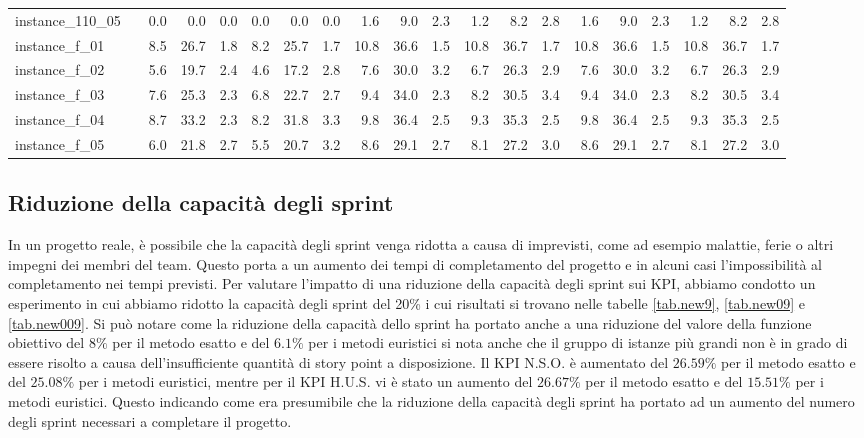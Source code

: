 \documentclass[12pt,a4paper,openright,twoside]{book}
\begin{document}
\begin{table}[H]
{\begin{tabular}{|ll|rrrrrr|rrrrrr|rrrrrr|}
 instance\_110\_05            &     &    0.0  &   0.0  &  0.0  &   0.0  &   0.0  &  0.0    &    1.6  &   9.0  &  2.3  &   1.2  &   8.2  &  2.8  &     1.6  &   9.0  &  2.3  &   1.2  &   8.2  &  2.8    \\   
 instance\_f\_01              &     &    8.5  &   26.7  &  1.8  &   8.2  &   25.7  &  1.7  &   10.8  &   36.6  &  1.5  &   10.8  &   36.7  &  1.7  &    10.8  &   36.6  &  1.5  &   10.8  &   36.7  &  1.7   \\ 
 instance\_f\_02              &     &    5.6  &   19.7  &  2.4  &   4.6  &   17.2  &  2.8  &    7.6  &   30.0  &  3.2  &   6.7  &   26.3  &  2.9  &     7.6  &   30.0  &  3.2  &   6.7  &   26.3  &  2.9   \\ 
 instance\_f\_03              &     &    7.6  &   25.3  &  2.3  &   6.8  &   22.7  &  2.7  &   9.4  &   34.0  &  2.3  &   8.2  &   30.5  &  3.4  &    9.4  &   34.0  &  2.3  &   8.2  &   30.5  &  3.4   \\ 
 instance\_f\_04              &     &    8.7  &   33.2  &  2.3  &   8.2  &   31.8  &  3.3  &    9.8  &   36.4  &  2.5  &   9.3  &   35.3  &  2.5  &     9.8  &   36.4  &  2.5  &   9.3  &   35.3  &  2.5   \\ 
 instance\_f\_05              &     &    6.0  &   21.8  &  2.7  &   5.5  &   20.7  &  3.2  &   8.6  &   29.1  &  2.7  &   8.1  &   27.2  &  3.0  &    8.6  &   29.1  &  2.7  &   8.1  &   27.2  &  3.0   \\ 
  \hline
\end{tabular}
}
\end{table}

\subsection{Riduzione della capacità degli sprint}



In un progetto reale, \`e possibile che la capacità degli sprint venga ridotta a causa di imprevisti, come ad esempio malattie, ferie o altri impegni dei membri del team. Questo porta a un aumento dei tempi di completamento del progetto e in alcuni casi l'impossibilità al completamento nei tempi previsti.
Per valutare l'impatto di una riduzione della capacità degli sprint sui KPI, abbiamo condotto un esperimento in cui abbiamo ridotto la capacità degli sprint del 20\% i cui risultati si trovano nelle tabelle \ref{tab.new9}, \ref{tab.new09} e \ref{tab.new009}.
Si può  notare come la riduzione della capacità dello sprint ha portato anche a una riduzione del valore della funzione obiettivo del $8\%$ per il metodo esatto e del $6.1\%$ per i metodi euristici si nota anche che il gruppo di istanze più grandi non \`e in grado di essere risolto a causa dell'insufficiente quantità di story point a disposizione.
Il KPI N.S.O. \`e aumentato del $26.59\%$ per il metodo esatto e del $25.08\%$ per i metodi euristici, mentre per il KPI H.U.S. vi \`e stato un aumento del $26.67\%$ per il metodo esatto e del $15.51\%$ per i metodi euristici. Questo indicando come era presumibile che la riduzione della capacità degli sprint ha portato ad un aumento del numero degli sprint necessari a completare il progetto.
\end{document}
